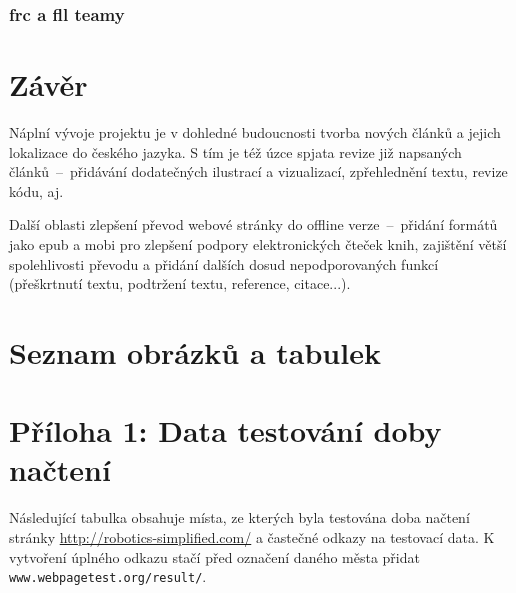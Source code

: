 \documentclass[a4paper, 12pt]{article}
\makeatletter
\renewcommand\listoffigures{%
    \@mkboth{\MakeUppercase\listfigurename}%
        {\MakeUppercase\listfigurename}%
    \@starttoc{lof}%
}
\renewcommand\listoftables{%
    \@mkboth{\MakeUppercase\listtablename}%
        {\MakeUppercase\listtablename}%
    \@starttoc{lot}%
}
\makeatother
\begin{document}
  \subsubsection{\acrshort{frc} a \acrshort{fll} teamy}

  \newpage

  \section{Závěr}
  Náplní vývoje projektu je v dohledné budoucnosti tvorba nových článků a jejich lokalizace do českého jazyka. S tím je též úzce spjata revize již napsaných článků~--~přidávání dodatečných ilustrací a vizualizací, zpřehlednění textu, revize kódu, aj.

  Další oblasti zlepšení převod webové stránky do offline verze~--~přidání formátů jako \gls{epub} a \gls{mobi} pro zlepšení podpory elektronických čteček knih, zajištění větší spolehlivosti převodu a přidání dalších dosud nepodporovaných funkcí (přeškrtnutí textu, podtržení textu, reference, citace...).


  \newpage

  \printbibliography[heading=bibnumbered, title=Použitá literatura]

  \newpage

  \section{Seznam obrázků a tabulek}
  {%
  \let\oldnumberline\numberline%
  \renewcommand{\numberline}{\figurename~\oldnumberline}%
  \listoffigures%
  }
  \vspace{\baselineskip}
  {%
  \let\oldnumberline\numberline%
  \renewcommand{\numberline}{\tablename~\oldnumberline}%
  \listoftables%
  }

  \newpage

  \section{Příloha 1: Data testování doby načtení} \label{sec:Příloha 1: Data testování doby načtení}
  Následující tabulka obsahuje místa, ze kterých byla testována doba načtení stránky \url{http://robotics-simplified.com/} a častečné odkazy na testovací data. K vytvoření úplného odkazu stačí před označení daného města přidat \texttt{www.webpagetest.org/result/}.
\end{document}

